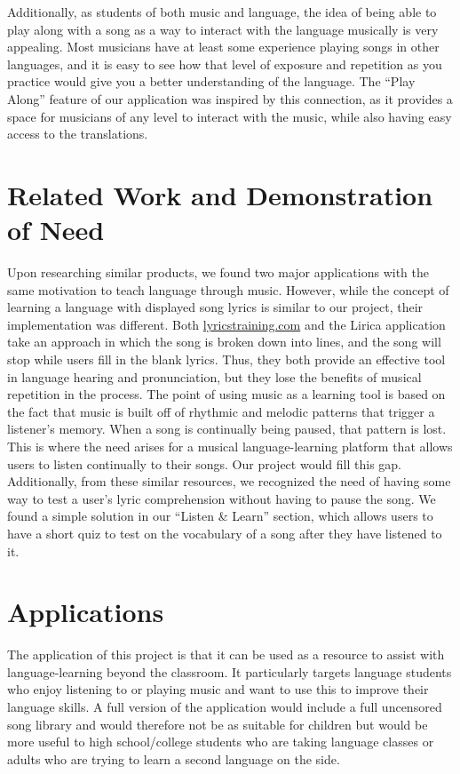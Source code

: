 \documentclass[conference, 12pt]{IEEEtran}
\begin{document}
Additionally, as students of both music and language, the idea of being able to play along with a song as a way to interact with the language musically is very appealing. 
Most musicians have at least some experience playing songs in other languages, and it is easy to see how that level of exposure and repetition as you practice would give you a better understanding of the language. 
The ``Play Along'' feature of our application was inspired by this connection, as it provides a space for musicians of any level to interact with the music, while also having easy access to the translations.


\section{Related Work and Demonstration of Need}
Upon researching similar products, we found two major applications with the same motivation to teach language through music. 
However, while the concept of learning a language with displayed song lyrics is similar to our project, their implementation was different. 
Both \url{lyricstraining.com} \cite{lyrics-training} and the Lirica application \cite{lirica} take an approach in which the song is broken down into lines, and the song will stop while users fill in the blank lyrics. 
Thus, they both provide an effective tool in language hearing and pronunciation, but they lose the benefits of musical repetition in the process.
The point of using music as a learning tool is based on the fact that music is built off of rhythmic and melodic patterns that trigger a listener's memory.
When a song is continually being paused, that pattern is lost. 
This is where the need arises for a musical language-learning platform that allows users to listen continually to their songs.
Our project would fill this gap. 
Additionally, from these similar resources, we recognized the need of having some way to test a user's lyric comprehension without having to pause the song.
We found a simple solution in our ``Listen \& Learn'' section, which allows users to have a short quiz to test on the vocabulary of a song after they have listened to it. 

\section{Applications}
The application of this project is that it can be used as a resource to assist with language-learning beyond the classroom. 
It particularly targets language students who enjoy listening to or playing music and want to use this to improve their language skills. 
A full version of the application would include a full uncensored song library and would therefore not be as suitable for children but would be more useful to high school/college students who are taking language classes or adults who are trying to learn a second language on the side. 
\end{document}

